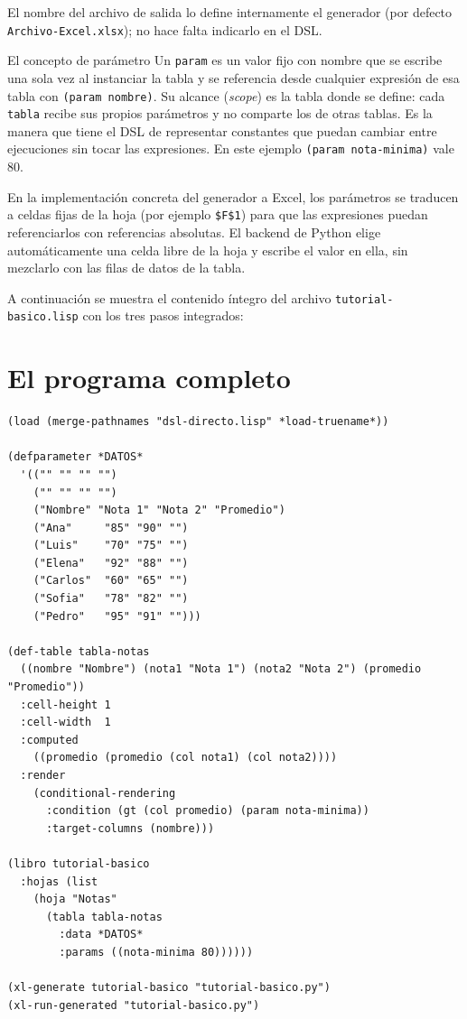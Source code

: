 \documentclass[12pt,a4paper]{report}
\begin{document}
El nombre del archivo de salida lo define internamente el generador
(por defecto \texttt{Archivo-Excel.xlsx}); no hace falta indicarlo
en el DSL.

\begin{infobox}{El concepto de parámetro}
  Un \texttt{param} es un valor fijo con nombre que se escribe una sola
  vez al instanciar la tabla y se referencia desde cualquier expresión
  de esa tabla con \texttt{(param nombre)}.  Su alcance (\emph{scope})
  es la tabla donde se define: cada \texttt{tabla} recibe sus propios
  parámetros y no comparte los de otras tablas.  Es la manera que tiene
  el DSL de representar constantes que puedan cambiar entre ejecuciones
  sin tocar las expresiones.  En este ejemplo \texttt{(param nota-minima)}
  vale 80.

  En la implementación concreta del generador a Excel, los parámetros se
  traducen a celdas fijas de la hoja (por ejemplo \texttt{\$F\$1}) para
  que las expresiones puedan referenciarlos con referencias absolutas.
  El backend de Python elige automáticamente una celda libre de la hoja
  y escribe el valor en ella, sin mezclarlo con las filas de datos de la
  tabla.
\end{infobox}

A continuación se muestra el contenido íntegro del archivo
\texttt{tutorial-basico.lisp} con los tres pasos integrados:

\section{El programa completo}

\begin{lstlisting}[caption={tutorial-basico.lisp --- programa completo.}]
(load (merge-pathnames "dsl-directo.lisp" *load-truename*))

(defparameter *DATOS*
  '(("" "" "" "")
    ("" "" "" "")
    ("Nombre" "Nota 1" "Nota 2" "Promedio")
    ("Ana"     "85" "90" "")
    ("Luis"    "70" "75" "")
    ("Elena"   "92" "88" "")
    ("Carlos"  "60" "65" "")
    ("Sofia"   "78" "82" "")
    ("Pedro"   "95" "91" "")))

(def-table tabla-notas
  ((nombre "Nombre") (nota1 "Nota 1") (nota2 "Nota 2") (promedio "Promedio"))
  :cell-height 1
  :cell-width  1
  :computed
    ((promedio (promedio (col nota1) (col nota2))))
  :render
    (conditional-rendering
      :condition (gt (col promedio) (param nota-minima))
      :target-columns (nombre)))

(libro tutorial-basico
  :hojas (list
    (hoja "Notas"
      (tabla tabla-notas
        :data *DATOS*
        :params ((nota-minima 80))))))

(xl-generate tutorial-basico "tutorial-basico.py")
(xl-run-generated "tutorial-basico.py")
\end{lstlisting}
\end{document}
